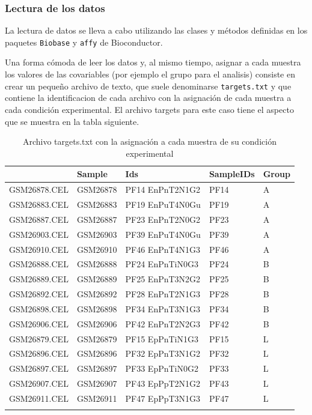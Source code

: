 \documentclass[a4paper]{article}\usepackage[]{graphicx}\usepackage[]{color}
\makeatletter
\newenvironment{kframe}{%
 \def\at@end@of@kframe{}%
 \ifinner\ifhmode%
  \def\at@end@of@kframe{\end{minipage}}%
  \begin{minipage}{\columnwidth}%
 \fi\fi%
 \def\FrameCommand##1{\hskip\@totalleftmargin \hskip-\fboxsep
 \colorbox{shadecolor}{##1}\hskip-\fboxsep
     \hskip-\linewidth \hskip-\@totalleftmargin \hskip\columnwidth}%
 \MakeFramed {\advance\hsize-\width
   \@totalleftmargin\z@ \linewidth\hsize
   \@setminipage}}%
 {\par\unskip\endMakeFramed%
 \at@end@of@kframe}
\newcommand{\Rcode}[1]{{\texttt{#1}}}
\makeatother
\begin{document}
\subsubsection{Lectura de los datos}

La lectura de datos se lleva a cabo utilizando las clases y métodos definidas en los paquetes \Rcode{Biobase} y \Rcode{affy} de Bioconductor.

Una forma cómoda de leer los datos y, al mismo tiempo, asignar a cada muestra los valores de las covariables (por ejemplo el grupo para el analisis) consiste en crear un pequeño archivo de texto, que suele denominarse \Rcode{targets.txt} y que contiene la identificacion de cada archivo con la asignación de cada muestra a cada condición experimental. El archivo targets para este caso tiene el aspecto que se muestra en la tabla siguiente.

\begin{kframe}


{\ttfamily\noindent\itshape\color{messagecolor}{\#\# Loading required package: xtable}}\end{kframe}%
\begin{longtable}{rllll}
  \hline
 & Sample & Ids & SampleIDs & Group \\ 
  \hline
GSM26878.CEL & GSM26878 & PF14 EnPnT2N1G2 & PF14 & A \\ 
  GSM26883.CEL & GSM26883 & PF19 EnPuT4N0Gu & PF19 & A \\ 
  GSM26887.CEL & GSM26887 & PF23 EnPnT2N0G2 & PF23 & A \\ 
  GSM26903.CEL & GSM26903 & PF39 EnPuT4N0Gu & PF39 & A \\ 
  GSM26910.CEL & GSM26910 & PF46 EnPnT4N1G3 & PF46 & A \\ 
  GSM26888.CEL & GSM26888 & PF24 EnPnTiN0G3 & PF24 & B \\ 
  GSM26889.CEL & GSM26889 & PF25 EnPnT3N2G2 & PF25 & B \\ 
  GSM26892.CEL & GSM26892 & PF28 EnPnT2N1G3 & PF28 & B \\ 
  GSM26898.CEL & GSM26898 & PF34 EnPnT3N1G3 & PF34 & B \\ 
  GSM26906.CEL & GSM26906 & PF42 EnPnT2N2G3 & PF42 & B \\ 
  GSM26879.CEL & GSM26879 & PF15 EpPnTiN1G3 & PF15 & L \\ 
  GSM26896.CEL & GSM26896 & PF32 EpPnT3N1G2 & PF32 & L \\ 
  GSM26897.CEL & GSM26897 & PF33 EpPnTiN0G2 & PF33 & L \\ 
  GSM26907.CEL & GSM26907 & PF43 EpPpT2N1G2 & PF43 & L \\ 
  GSM26911.CEL & GSM26911 & PF47 EpPpT3N1G3 & PF47 & L \\ 
   \hline
\hline
\caption{Archivo targets.txt con la asignación a cada muestra de su condición experimental} 
\end{longtable}
\end{document}

